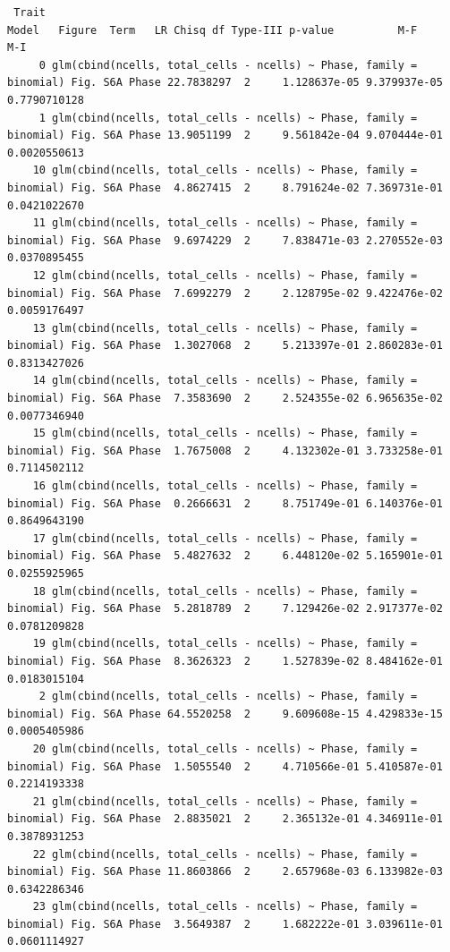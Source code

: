 \documentclass[
  landscape]{article}
\begin{document}
\begin{verbatim}
 Trait                                                               Model   Figure  Term   LR Chisq df Type-III p-value          M-F          M-I
     0 glm(cbind(ncells, total_cells - ncells) ~ Phase, family = binomial) Fig. S6A Phase 22.7838297  2     1.128637e-05 9.379937e-05 0.7790710128
     1 glm(cbind(ncells, total_cells - ncells) ~ Phase, family = binomial) Fig. S6A Phase 13.9051199  2     9.561842e-04 9.070444e-01 0.0020550613
    10 glm(cbind(ncells, total_cells - ncells) ~ Phase, family = binomial) Fig. S6A Phase  4.8627415  2     8.791624e-02 7.369731e-01 0.0421022670
    11 glm(cbind(ncells, total_cells - ncells) ~ Phase, family = binomial) Fig. S6A Phase  9.6974229  2     7.838471e-03 2.270552e-03 0.0370895455
    12 glm(cbind(ncells, total_cells - ncells) ~ Phase, family = binomial) Fig. S6A Phase  7.6992279  2     2.128795e-02 9.422476e-02 0.0059176497
    13 glm(cbind(ncells, total_cells - ncells) ~ Phase, family = binomial) Fig. S6A Phase  1.3027068  2     5.213397e-01 2.860283e-01 0.8313427026
    14 glm(cbind(ncells, total_cells - ncells) ~ Phase, family = binomial) Fig. S6A Phase  7.3583690  2     2.524355e-02 6.965635e-02 0.0077346940
    15 glm(cbind(ncells, total_cells - ncells) ~ Phase, family = binomial) Fig. S6A Phase  1.7675008  2     4.132302e-01 3.733258e-01 0.7114502112
    16 glm(cbind(ncells, total_cells - ncells) ~ Phase, family = binomial) Fig. S6A Phase  0.2666631  2     8.751749e-01 6.140376e-01 0.8649643190
    17 glm(cbind(ncells, total_cells - ncells) ~ Phase, family = binomial) Fig. S6A Phase  5.4827632  2     6.448120e-02 5.165901e-01 0.0255925965
    18 glm(cbind(ncells, total_cells - ncells) ~ Phase, family = binomial) Fig. S6A Phase  5.2818789  2     7.129426e-02 2.917377e-02 0.0781209828
    19 glm(cbind(ncells, total_cells - ncells) ~ Phase, family = binomial) Fig. S6A Phase  8.3626323  2     1.527839e-02 8.484162e-01 0.0183015104
     2 glm(cbind(ncells, total_cells - ncells) ~ Phase, family = binomial) Fig. S6A Phase 64.5520258  2     9.609608e-15 4.429833e-15 0.0005405986
    20 glm(cbind(ncells, total_cells - ncells) ~ Phase, family = binomial) Fig. S6A Phase  1.5055540  2     4.710566e-01 5.410587e-01 0.2214193338
    21 glm(cbind(ncells, total_cells - ncells) ~ Phase, family = binomial) Fig. S6A Phase  2.8835021  2     2.365132e-01 4.346911e-01 0.3878931253
    22 glm(cbind(ncells, total_cells - ncells) ~ Phase, family = binomial) Fig. S6A Phase 11.8603866  2     2.657968e-03 6.133982e-03 0.6342286346
    23 glm(cbind(ncells, total_cells - ncells) ~ Phase, family = binomial) Fig. S6A Phase  3.5649387  2     1.682222e-01 3.039611e-01 0.0601114927

\end{verbatim}
\end{document}
